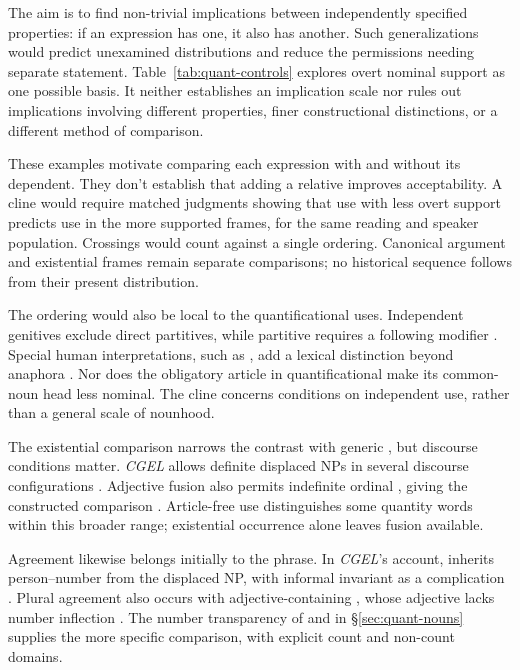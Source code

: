 \documentclass[12pt]{article}
\begin{document}
The aim is to find non-trivial implications between independently specified properties: if an expression has one, it also has another. Such generalizations would predict unexamined distributions and reduce the permissions needing separate statement. Table~\ref{tab:quant-controls} explores overt nominal support as one possible basis. It neither establishes an implication scale nor rules out implications involving different properties, finer constructional distinctions, or a different method of comparison.

These examples motivate comparing each expression with and without its dependent. They don't establish that adding a relative improves acceptability. A cline would require matched judgments showing that use with less overt support predicts use in the more supported frames, for the same reading and speaker population. Crossings would count against a single ordering. Canonical argument and existential frames remain separate comparisons; no historical sequence follows from their present distribution.

The ordering would also be local to the quantificational uses. Independent genitives exclude direct partitives, while partitive  requires a following modifier \citep[413]{huddleston2002}. Special human interpretations, such as , add a lexical distinction beyond anaphora \citep[414]{huddleston2002}. Nor does the obligatory article in quantificational  make its common-noun head less nominal. The cline concerns conditions on independent use, rather than a general scale of nounhood.

The existential comparison narrows the contrast with generic , but discourse conditions matter. \textit{CGEL} allows definite displaced NPs in several discourse configurations \citep[1397--1401]{huddleston2002}. Adjective fusion also permits indefinite ordinal  \citep[416]{huddleston2002}, giving the constructed comparison . Article-free use distinguishes some quantity words within this broader range; existential occurrence alone leaves fusion available.

Agreement likewise belongs initially to the phrase. In \textit{CGEL}'s account,  inherits person--number from the displaced NP, with informal invariant  as a complication \citep[242]{huddleston2002}. Plural agreement also occurs with adjective-containing , whose adjective lacks number inflection \citep[418]{huddleston2002}. The number transparency of  and  in §\ref{sec:quant-nouns} supplies the more specific comparison, with explicit count and non-count domains.
\end{document}
